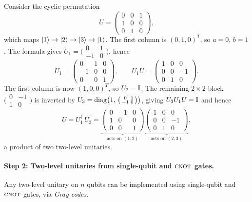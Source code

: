 \begin{example}\label{ex:two-level-3x3}
  Consider the cyclic permutation
  \[
    U = \begin{pmatrix} 0 & 0 & 1 \\ 1 & 0 & 0 \\ 0 & 1 & 0 \end{pmatrix},
  \]
  which maps $|1\rangle\to|2\rangle\to|3\rangle\to|1\rangle$.  The first column is
  $(0,1,0)^T$, so $a=0$, $b=1$.  The formula gives
  $\widetilde{U}_1 = \bigl(\begin{smallmatrix} 0 & 1 \\ -1 & 0
  \end{smallmatrix}\bigr)$, hence
  \[
    U_1 = \begin{pmatrix} 0 & 1 & 0 \\ -1 & 0 & 0 \\ 0 & 0 & 1
    \end{pmatrix}, \qquad
    U_1 U = \begin{pmatrix} 1 & 0 & 0 \\ 0 & 0 & -1 \\ 0 & 1 & 0
    \end{pmatrix}.
  \]
  The first column is now $(1,0,0)^T$, so $U_2=\mathbb{I}$.  The remaining
  $2\times 2$ block $\bigl(\begin{smallmatrix} 0 & -1 \\ 1 & 0
  \end{smallmatrix}\bigr)$ is inverted by
  $U_3 = \operatorname{diag}\bigl(1,\,\bigl(\begin{smallmatrix} 0 & 1 \\ -1 & 0
  \end{smallmatrix}\bigr)\bigr)$, giving $U_3 U_1 U = \mathbb{I}$ and hence
  \[
    U = U_1^\dagger\, U_3^\dagger
    = \underbrace{\begin{pmatrix} 0 & -1 & 0 \\ 1 & 0 & 0 \\ 0 & 0 & 1
    \end{pmatrix}}_{\text{acts on $(1,2)$}}
    \underbrace{\begin{pmatrix} 1 & 0 & 0 \\ 0 & 0 & -1 \\ 0 & 1 & 0
    \end{pmatrix}}_{\text{acts on $(2,3)$}},
  \]
  a product of two two-level unitaries.
\end{example}

\paragraph{Step 2: Two-level unitaries from single-qubit and $\textsc{cnot}$ gates.}
Any two-level unitary on $n$ qubits can be implemented using single-qubit
and $\textsc{cnot}$ gates, via \emph{Gray codes}.

